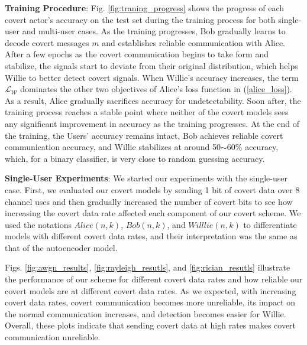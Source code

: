 \textbf{Training Procedure}: Fig. \ref{fig:traning_progress} shows the progress of each covert actor's accuracy on the test set during the training process for both single-user and multi-user cases. As the training progresses, Bob gradually learns to decode covert messages \(m\) and establishes reliable communication with Alice. After a few epochs as the covert communication begins to take form and stabilize, the signals start to deviate from their original distribution, which helps Willie to better detect covert signals. When Willie's accuracy increases, the term \(\mathcal{L}_{\mathcal{W}}\) dominates the other two objectives of Alice's loss function in (\ref{alice_loss}). As a result, Alice gradually sacrifices accuracy for undetectability. Soon after, the training process reaches a stable point where neither of the covert models sees any significant improvement in accuracy as the training progresses. At the end of the training, the Users' accuracy remains intact, Bob achieves reliable covert communication accuracy, and Willie stabilizes at around 50$\sim$60\% accuracy, which, for a binary classifier, is very close to random guessing accuracy.

\textbf{Single-User Experiments}: 
We started our experiments with the single-user case. First, we evaluated our covert models by sending 1 bit of covert data over 8 channel uses and then gradually increased the number of covert bits to see how increasing the covert data rate affected each component of our covert scheme. We used the notations \(Alice (n,k)\), \(Bob (n,k)\), and \(Willlie (n,k)\) to differentiate models with different covert data rates, and their interpretation was the same as that of the autoencoder model.

Figs. \ref{fig:awgn_results}, \ref{fig:rayleigh_resutls}, and \ref{fig:rician_resutls} illustrate the performance of our scheme for different covert data rates and how reliable our covert models are at different covert data rates. As we expected, with increasing covert data rates, covert communication becomes more unreliable, its impact on the normal communication increases, and detection becomes easier for Willie. Overall, these plots indicate that sending covert data at high rates makes covert communication unreliable.

